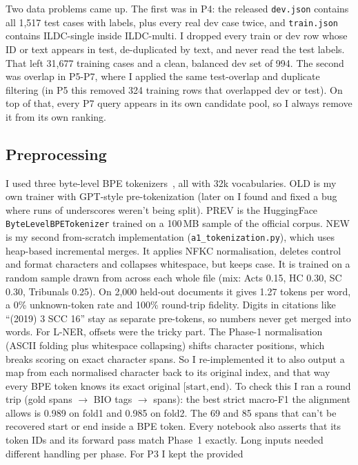 \documentclass[11pt, oneside]{article}
\begin{document}
Two data problems came up. The first was in P4: the released
\texttt{dev.json} contains all 1,517 test cases with labels, plus every real
dev case twice, and \texttt{train.json} contains ILDC-single inside
ILDC-multi. I dropped every train or dev row whose ID or text appears in test,
de-duplicated by text, and never read the test labels. That left 31,677
training cases and a clean, balanced dev set of 994. The second was overlap in
P5-P7, where I applied the same test-overlap and duplicate filtering (in P5
this removed 324 training rows that overlapped dev or test). On top of that,
every P7 query appears in its own candidate pool, so I always remove it from
its own ranking.

\subsection{Preprocessing}
I used three byte-level BPE tokenizers~\cite{sennrich2016bpe}, all with 32k vocabularies.
OLD is my own trainer with GPT-style pre-tokenization (later on I found and
fixed a bug where runs of underscores weren't being split). PREV is the
HuggingFace \texttt{ByteLevelBPETokenizer} trained on a 100\,MB sample of the
official corpus. NEW is my second from-scratch implementation
(\texttt{a1\_tokenization.py}), which uses heap-based incremental merges. It
applies NFKC normalisation, deletes control and format characters and
collapses whitespace, but keeps case. It is trained on a random sample drawn
from across each whole file (mix: Acts 0.15, HC 0.30, SC 0.30, Tribunals
0.25). On 2,000 held-out documents it gives 1.27 tokens per word, a 0\%
unknown-token rate and 100\% round-trip fidelity. Digits in citations like
``(2019) 3 SCC 16'' stay as separate pre-tokens, so numbers never get merged
into words.
For L-NER, offsets were the tricky part. The Phase-1 normalisation (ASCII
folding plus whitespace collapsing) shifts character positions, which breaks
scoring on exact character spans. So I re-implemented it to also output a map
from each normalised character back to its original index, and that way every
BPE token knows its exact original $[\text{start},\text{end})$. To check this I
ran a round trip (gold spans $\rightarrow$ BIO tags $\rightarrow$ spans): the
best strict macro-F1 the alignment allows is 0.989 on fold1 and 0.985 on
fold2. The 69 and 85 spans that can't be recovered start or end inside a BPE
token. Every notebook also asserts that its token IDs and its forward pass match Phase~1 exactly.
Long inputs needed different handling per phase. For P3 I kept the provided
\end{document}
